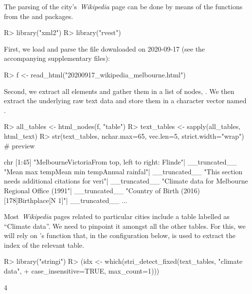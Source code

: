 \documentclass[nojss]{jss}\usepackage[]{graphicx}\usepackage[]{color}
\begin{document}
The parsing of the city's~\textit{Wikipedia} page
can be done by means of the functions from the
 \citep{xml2}
and  \citep{rvest} packages.

\begin{Schunk}
\begin{Sinput}
R> library("xml2")
R> library("rvest")
\end{Sinput}
\end{Schunk}

First, we load and parse the  file
downloaded on 2020-09-17 (see the accompanying supplementary files):

\begin{Schunk}
\begin{Sinput}
R> f <- read_html("20200917_wikipedia_melbourne.html")
\end{Sinput}
\end{Schunk}

Second, we extract all  elements and gather them
in a list of  nodes, .
We then extract the underlying raw text data and store them in a
character vector named .

\begin{Schunk}
\begin{Sinput}
R> all_tables <- html_nodes(f, "table")
R> text_tables <- sapply(all_tables, html_text)
R> str(text_tables, nchar.max=65, vec.len=5, strict.width="wrap") # preview
\end{Sinput}
\begin{Soutput}
chr [1:45] "MelbourneVictoriaFrom top, left to right: Flinde"| __truncated__
   "Mean max temp\n Mean min temp\n Annual rainfal"| __truncated__ "This
   section needs additional citations for veri"| __truncated__ "Climate data
   for Melbourne Regional Office (1991"| __truncated__ "Country of Birth
   (2016)[178]Birthplace[N 1]\nPop"| __truncated__ ...
\end{Soutput}
\end{Schunk}

Most~\textit{Wikipedia} pages related to particular cities
include a table labelled as ``Climate data''.
We need to pinpoint it amongst all the other tables.
For this, we will rely on 's
  function that, in the configuration
below, is used to extract the index of the relevant table.

\begin{Schunk}
\begin{Sinput}
R> library("stringi")
R> (idx <- which(stri_detect_fixed(text_tables, "climate data",
+    case_insensitive=TRUE, max_count=1)))
\end{Sinput}
\begin{Soutput}
[1] 4
\end{Soutput}
\end{Schunk}
\end{document}
